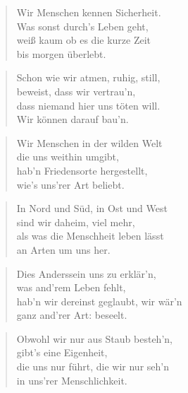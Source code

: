 \documentclass[10pt,a4paper]{article}
\begin{document}
\begin{paracol}{2}
\begin{verse}
Wir Menschen kennen Sicherheit. \\
Was sonst durch’s Leben geht, \\
weiß kaum ob es die kurze Zeit \\
bis morgen überlebt. \\
\end{verse}

\begin{verse}
Schon wie wir atmen, ruhig, still, \\
beweist, dass wir vertrau’n, \\
dass niemand hier uns töten will. \\
Wir können darauf bau’n. \\
\end{verse}

\begin{verse}
Wir Menschen in der wilden Welt \\
die uns weithin umgibt, \\
hab’n Friedensorte hergestellt, \\
wie’s uns’rer Art beliebt. \\
\end{verse}

\begin{verse}
In Nord und Süd, in Ost und West \\
sind wir daheim, viel mehr, \\
als was die Menschheit leben lässt \\
an Arten um uns her. \\
\end{verse}

\begin{verse}
Dies Anderssein uns zu erklär’n, \\
was and’rem Leben fehlt, \\
hab’n wir dereinst geglaubt, wir wär’n \\
ganz and’rer Art: beseelt. \\
\end{verse}

\begin{verse}
Obwohl wir nur aus Staub besteh’n, \\
gibt’s eine Eigenheit, \\
die uns nur führt, die wir nur seh’n \\
in uns’rer Menschlichkeit. \\
\end{verse}


\end{paracol}
\end{document}
